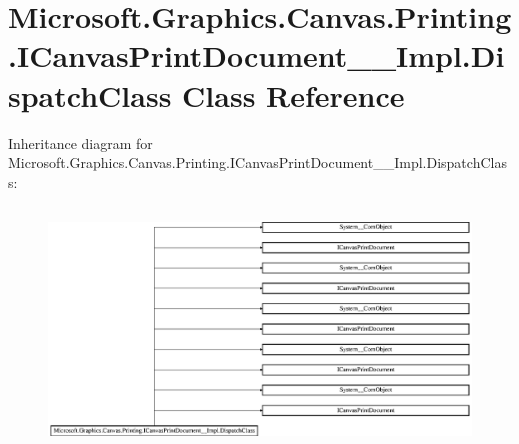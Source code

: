 \hypertarget{class_microsoft_1_1_graphics_1_1_canvas_1_1_printing_1_1_i_canvas_print_document_____impl_1_1_dispatch_class}{}\section{Microsoft.\+Graphics.\+Canvas.\+Printing.\+I\+Canvas\+Print\+Document\+\_\+\+\_\+\+Impl.\+Dispatch\+Class Class Reference}
\label{class_microsoft_1_1_graphics_1_1_canvas_1_1_printing_1_1_i_canvas_print_document_____impl_1_1_dispatch_class}
Inheritance diagram for Microsoft.\+Graphics.\+Canvas.\+Printing.\+I\+Canvas\+Print\+Document\+\_\+\+\_\+\+Impl.\+Dispatch\+Class\+:\begin{figure}[H]
\begin{center}
\leavevmode
\includegraphics[height=6.497890cm]{class_microsoft_1_1_graphics_1_1_canvas_1_1_printing_1_1_i_canvas_print_document_____impl_1_1_dispatch_class}
\end{center}
\end{figure}
